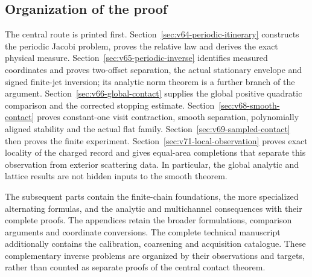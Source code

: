 \subsection{Organization of the proof}

The central route is printed first.  Section~\ref{sec:v64-periodic-itinerary}
constructs the periodic Jacobi problem, proves the relative law and derives
the exact physical measure.  Section~\ref{sec:v65-periodic-inverse}
identifies measured coordinates and proves two-offset separation, the
actual stationary envelope and signed finite-jet inversion; its analytic
norm theorem is a further branch of the argument.
Section~\ref{sec:v66-global-contact} supplies the global positive
quadratic comparison and the corrected stopping estimate.
Section~\ref{sec:v68-smooth-contact} proves constant-one visit contraction,
smooth separation, polynomially aligned stability and the actual flat
family.  Section~\ref{sec:v69-sampled-contact} then proves the finite
experiment.  Section~\ref{sec:v71-local-observation} proves exact
locality of the charged record and gives equal-area completions that
separate this observation from exterior scattering data.  In particular,
the global analytic and lattice results are
not hidden inputs to the smooth theorem.

The subsequent parts contain the finite-chain foundations, the more
specialized alternating formulas, and the analytic and multichannel
consequences with their complete proofs.  The appendices retain the
broader formulations, comparison arguments and coordinate conversions.
The complete technical manuscript additionally contains the calibration,
coarsening and acquisition catalogue.  These complementary inverse
problems are organized by their observations and targets, rather than
counted as separate proofs of the central contact theorem.
